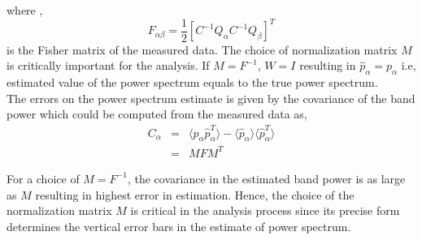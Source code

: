 \documentclass[twocolumn]{emulateapj}
\begin{document}
where , 
\begin{equation}
 F_{\alpha\beta} = \frac {1} { 2} [C^{-1}Q_{\alpha}C^{-1}Q_{\beta}]^{T}
 \label{eq20}
\end{equation} 
 is the Fisher matrix of the measured data. The choice of normalization matrix $M$ is critically important for the analysis. If $M = F^{-1}$, $W=I$ resulting in $\hat p_{\alpha} = p_{\alpha}$ i.e, estimated value of the power spectrum equals to the true power spectrum.\\
 The errors on the power spectrum estimate is given by the covariance of the band power which could be computed from the measured data as,  
\begin{eqnarray}
 C_{\alpha} & = & \langle \hat p_{\alpha} \hat p_{\alpha}^{T} \rangle - \langle \hat p_{\alpha} \rangle \langle \hat p_{\alpha}^{T} \rangle \nonumber\\
 		& = & MFM^{T}
\label{eq21}
 \end{eqnarray} 
 
 For a choice of $M = F^{-1}$, the covariance in the estimated band power is as large as $M$ resulting in highest error in estimation. Hence, the choice of the normalization matrix $M$ is critical in the analysis process since its precise form determines the vertical error bars in the estimate of power spectrum. 
\end{document}
